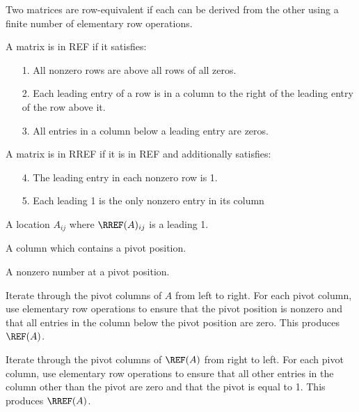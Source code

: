 \begin{definition} Two matrices are row-equivalent if each can be derived from the other using a finite number of elementary row operations.
\end{definition}

\begin{definition} A matrix is in REF if it satisfies:
  \begin{enumerate}
    \item[1.] All nonzero rows are above all rows of all zeros.
    \item[2.] Each leading entry of a row is in a column to the right of the leading entry of the row above it.
    \item[3.] All entries in a column below a leading entry are zeros.
  \end{enumerate}
\end{definition}

\begin{definition} A matrix is in RREF if it is in REF and additionally satisfies:
  \begin{enumerate}
    \item[4.] The leading entry in each nonzero row is 1.
    \item[5.] Each leading 1 is the only nonzero entry in its column
  \end{enumerate}
\end{definition}

\begin{definition} A location $A_{ij}$ where $\RREF(A)_{ij}$ is a leading 1.
\end{definition}

\begin{definition} A column which contains a pivot position.
\end{definition}

\begin{definition}[Pivot] A nonzero number at a pivot position.
\end{definition}

\begin{procedure}
  \begin{procedure}
    Iterate through the pivot columns of $A$ from left to right. For each pivot column, use elementary row operations to ensure that the pivot position is nonzero and that all entries in the column below the pivot position are zero. This produces $\REF(A)$.
  \end{procedure}

  \begin{procedure}
    Iterate through the pivot columns of $\REF(A)$ from right to left. For each pivot column, use elementary row operations to ensure that all other entries in the column other than the pivot are zero and that the pivot is equal to 1. This produces $\RREF(A)$.
  \end{procedure}
\end{procedure}

